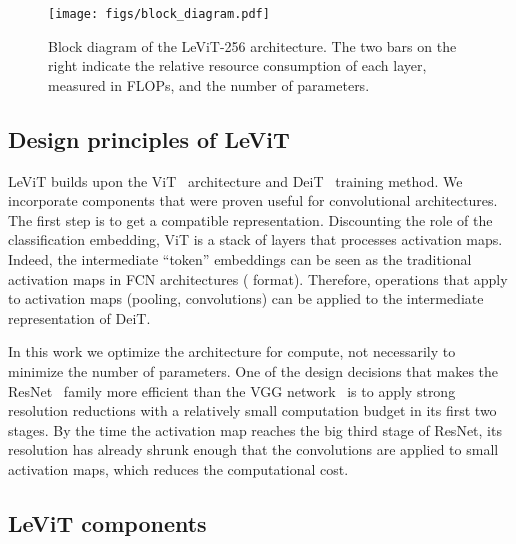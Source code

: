 \documentclass[10pt,twocolumn,letterpaper]{article}
\makeatletter
\renewcommand{\paragraph}{\@startsection{paragraph}{4}{\z@}{1.0ex \@plus 1ex \@minus .2ex}{-1em}{\normalfont\normalsize\bfseries}}
\makeatother
\begin{document}
\begin{figure}
\centering
\texttt{[image: figs/block\_diagram.pdf]}
\vspace{-15pt}
\caption{\label{fig:blockdiagram}
	Block diagram of the LeViT-256 architecture. 
	The two bars on the right indicate the relative resource consumption of each layer, measured in FLOPs, and the number of parameters.
}
\vspace{-10pt}
\end{figure}













\subsection{Design principles of LeViT}

LeViT builds upon the ViT~\cite{dosovitskiy2020image} architecture and DeiT~\cite{Touvron2021DeiT} training method. We incorporate components that were proven useful for convolutional architectures. 
The first step is to get a compatible representation. 
Discounting the role of the classification embedding, ViT is a stack of layers that processes activation maps.
Indeed, the intermediate ``token'' embeddings can be seen as the traditional  activation maps in FCN architectures ( format). 
Therefore, operations that apply to activation maps (pooling, convolutions) can be applied to the intermediate representation of DeiT. 

In this work we optimize the architecture for compute, not necessarily to minimize the number of parameters. 
One of the design decisions that makes the ResNet~\cite{He2016ResNet} family more efficient than the VGG network~\cite{Simonyan2015VGG} is to apply strong resolution reductions with a relatively small computation budget in its first two stages. 
By the time the activation map reaches the big third stage of ResNet, its resolution has already shrunk enough that the convolutions are applied to small activation maps, which reduces the computational cost. 

\subsection{LeViT components}

\paragraph{Patch embedding.}
\end{document}
